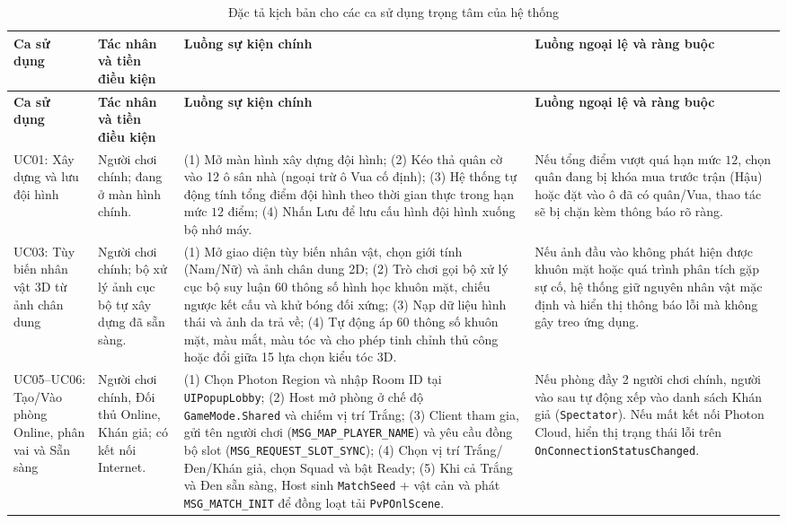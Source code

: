 {\small
\begin{longtable}{|L{2.5cm}|L{2.4cm}|L{5.3cm}|L{4.7cm}|}
    \caption{Đặc tả kịch bản cho các ca sử dụng trọng tâm của hệ thống}
    \label{tab:usecase_specs} \\
    \hline
    \textbf{Ca sử dụng} & \textbf{Tác nhân và tiền điều kiện} & \textbf{Luồng sự kiện chính} & \textbf{Luồng ngoại lệ và ràng buộc} \\
    \hline
    \endfirsthead
    \hline
    \textbf{Ca sử dụng} & \textbf{Tác nhân và tiền điều kiện} & \textbf{Luồng sự kiện chính} & \textbf{Luồng ngoại lệ và ràng buộc} \\
    \hline
    \endhead
    \hline
    \endfoot
        UC01: Xây dựng và lưu đội hình & Người chơi chính; đang ở màn hình chính. & (1) Mở màn hình xây dựng đội hình; (2) Kéo thả quân cờ vào 12 ô sân nhà (ngoại trừ ô Vua cố định); (3) Hệ thống tự động tính tổng điểm đội hình theo thời gian thực trong hạn mức $12$ điểm; (4) Nhấn Lưu để lưu cấu hình đội hình xuống bộ nhớ máy. & Nếu tổng điểm vượt quá hạn mức $12$, chọn quân đang bị khóa mua trước trận (Hậu) hoặc đặt vào ô đã có quân/Vua, thao tác sẽ bị chặn kèm thông báo rõ ràng. \\
        \hline
        UC03: Tùy biến nhân vật 3D từ ảnh chân dung & Người chơi chính; bộ xử lý ảnh cục bộ tự xây dựng đã sẵn sàng. & (1) Mở giao diện tùy biến nhân vật, chọn giới tính (Nam/Nữ) và ảnh chân dung 2D; (2) Trò chơi gọi bộ xử lý cục bộ suy luận 60 thông số hình học khuôn mặt, chiếu ngược kết cấu và khử bóng đối xứng; (3) Nạp dữ liệu hình thái và ảnh da trả về; (4) Tự động áp 60 thông số khuôn mặt, màu mắt, màu tóc và cho phép tinh chỉnh thủ công hoặc đổi giữa 15 lựa chọn kiểu tóc 3D. & Nếu ảnh đầu vào không phát hiện được khuôn mặt hoặc quá trình phân tích gặp sự cố, hệ thống giữ nguyên nhân vật mặc định và hiển thị thông báo lỗi mà không gây treo ứng dụng. \\
        \hline
        UC05--UC06: Tạo/Vào phòng Online, phân vai và Sẵn sàng & Người chơi chính, Đối thủ Online, Khán giả; có kết nối Internet. & (1) Chọn Photon Region và nhập Room ID tại \texttt{UIPopupLobby}; (2) Host mở phòng ở chế độ \texttt{GameMode.Shared} và chiếm vị trí Trắng; (3) Client tham gia, gửi tên người chơi (\texttt{MSG\_MAP\_PLAYER\_NAME}) và yêu cầu đồng bộ slot (\texttt{MSG\_REQUEST\_SLOT\_SYNC}); (4) Chọn vị trí Trắng/Đen/Khán giả, chọn Squad và bật Ready; (5) Khi cả Trắng và Đen sẵn sàng, Host sinh \texttt{MatchSeed} + vật cản và phát \texttt{MSG\_MATCH\_INIT} để đồng loạt tải \texttt{PvPOnlScene}. & Nếu phòng đầy 2 người chơi chính, người vào sau tự động xếp vào danh sách Khán giả (\texttt{Spectator}). Nếu mất kết nối Photon Cloud, hiển thị trạng thái lỗi trên \texttt{OnConnectionStatusChanged}. \\

\end{longtable}}
